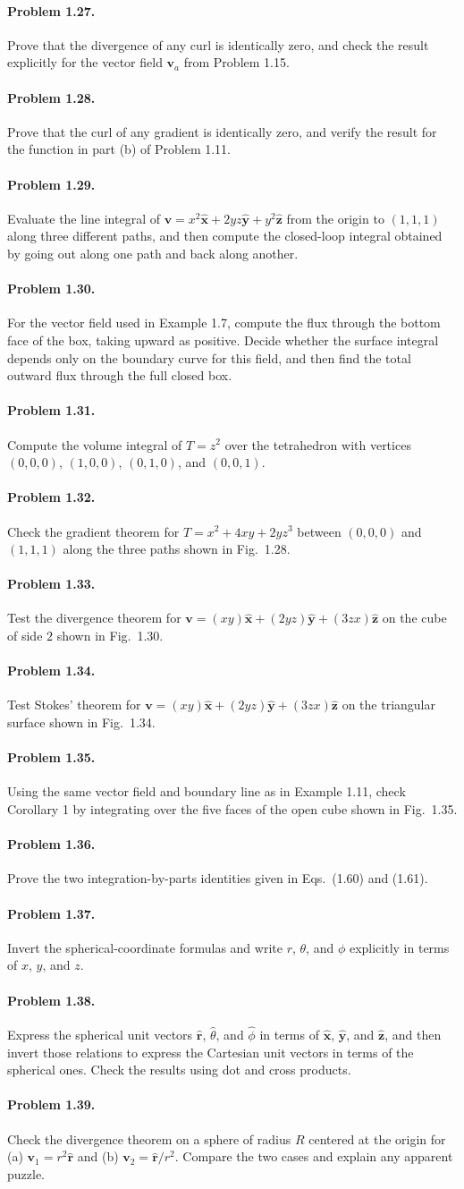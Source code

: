 \documentclass{aa}
\newcommand{\problemstatement}[2]{%
\paragraph{Problem #1.}#2\par\medskip
}
\begin{document}
\problemstatement{1.27}{Prove that the divergence of any curl is identically zero, and check the result explicitly for the vector field \( \mathbf v_a \) from Problem 1.15.}
\problemstatement{1.28}{Prove that the curl of any gradient is identically zero, and verify the result for the function in part (b) of Problem 1.11.}
\problemstatement{1.29}{Evaluate the line integral of \(\mathbf v=x^2\hat{\mathbf x}+2yz\hat{\mathbf y}+y^2\hat{\mathbf z}\) from the origin to \((1,1,1)\) along three different paths, and then compute the closed-loop integral obtained by going out along one path and back along another.}
\problemstatement{1.30}{For the vector field used in Example 1.7, compute the flux through the bottom face of the box, taking upward as positive. Decide whether the surface integral depends only on the boundary curve for this field, and then find the total outward flux through the full closed box.}
\problemstatement{1.31}{Compute the volume integral of \(T=z^2\) over the tetrahedron with vertices \((0,0,0)\), \((1,0,0)\), \((0,1,0)\), and \((0,0,1)\).}
\problemstatement{1.32}{Check the gradient theorem for \(T=x^2+4xy+2yz^3\) between \((0,0,0)\) and \((1,1,1)\) along the three paths shown in Fig.~1.28.}
\problemstatement{1.33}{Test the divergence theorem for \(\mathbf v=(xy)\hat{\mathbf x}+(2yz)\hat{\mathbf y}+(3zx)\hat{\mathbf z}\) on the cube of side \(2\) shown in Fig.~1.30.}
\problemstatement{1.34}{Test Stokes' theorem for \(\mathbf v=(xy)\hat{\mathbf x}+(2yz)\hat{\mathbf y}+(3zx)\hat{\mathbf z}\) on the triangular surface shown in Fig.~1.34.}
\problemstatement{1.35}{Using the same vector field and boundary line as in Example 1.11, check Corollary 1 by integrating over the five faces of the open cube shown in Fig.~1.35.}
\problemstatement{1.36}{Prove the two integration-by-parts identities given in Eqs.~(1.60) and (1.61).}
\problemstatement{1.37}{Invert the spherical-coordinate formulas and write \(r\), \(\theta\), and \(\phi\) explicitly in terms of \(x\), \(y\), and \(z\).}
\problemstatement{1.38}{Express the spherical unit vectors \(\hat{\mathbf r}\), \(\hat{\theta}\), and \(\hat{\phi}\) in terms of \(\hat{\mathbf x}\), \(\hat{\mathbf y}\), and \(\hat{\mathbf z}\), and then invert those relations to express the Cartesian unit vectors in terms of the spherical ones. Check the results using dot and cross products.}
\problemstatement{1.39}{Check the divergence theorem on a sphere of radius \(R\) centered at the origin for (a) \(\mathbf v_1=r^2\hat{\mathbf r}\) and (b) \(\mathbf v_2=\hat{\mathbf r}/r^2\). Compare the two cases and explain any apparent puzzle.}
\end{document}
